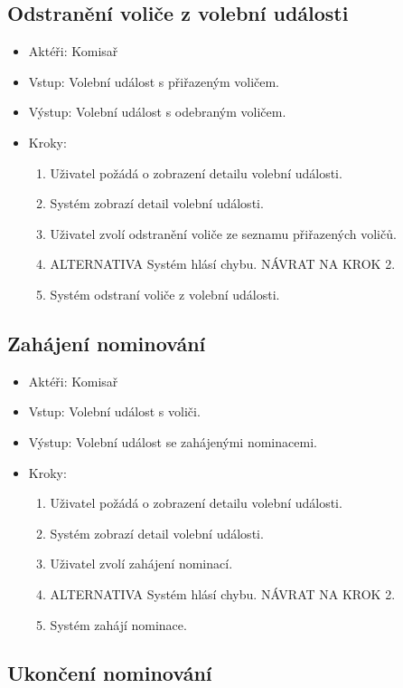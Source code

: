 \documentclass[11pt,twoside,a4paper]{book}
\begin{document}
\subsection{Odstranění voliče z volební události}

\begin{itemize}
\item Aktéři: Komisař
\item Vstup: Volební událost s přiřazeným voličem.
\item Výstup: Volební událost s odebraným voličem.
\item Kroky:
	\begin{enumerate}
		\item Uživatel požádá o zobrazení detailu volební události.
		\item Systém zobrazí detail volební události.
		\item Uživatel zvolí odstranění voliče ze seznamu přiřazených voličů.		
		\item ALTERNATIVA Systém hlásí chybu. NÁVRAT NA KROK 2.
		\item Systém odstraní voliče z volební události.
	\end{enumerate}
\end{itemize}

\subsection{Zahájení nominování}

\begin{itemize}
\item Aktéři: Komisař
\item Vstup: Volební událost s voliči.
\item Výstup: Volební událost se zahájenými nominacemi.
\item Kroky:
	\begin{enumerate}
		\item Uživatel požádá o zobrazení detailu volební události.
		\item Systém zobrazí detail volební události.
		\item Uživatel zvolí zahájení nominací.		
		\item ALTERNATIVA Systém hlásí chybu. NÁVRAT NA KROK 2.
		\item Systém zahájí nominace.
	\end{enumerate}
\end{itemize}

\subsection{Ukončení nominování}
\end{document}
